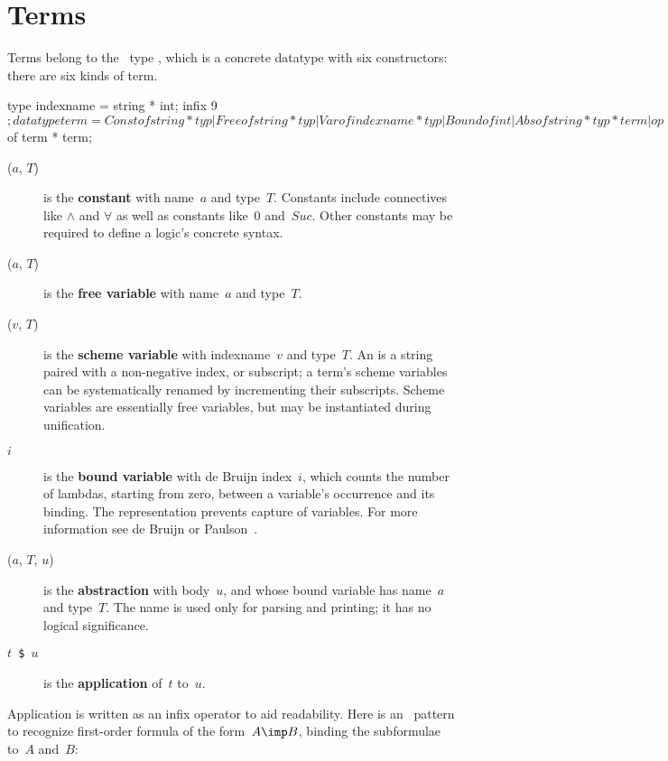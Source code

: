 \section{Terms}
Terms belong to the \ML\ type , which is a concrete datatype
with six constructors: there are six kinds of term.
\begin{ttbox}
type indexname = string * int;
infix 9 $;
datatype term = Const of string * typ
              | Free  of string * typ
              | Var   of indexname * typ
              | Bound of int
              | Abs   of string * typ * term
              | op $  of term * term;
\end{ttbox}
\begin{description}
\item[($a$, $T$)] 
  is the {\bf constant} with name~$a$ and type~$T$.  Constants include
  connectives like $\land$ and $\forall$ as well as constants like~0
  and~$Suc$.  Other constants may be required to define a logic's concrete
  syntax. 

\item[($a$, $T$)] 
is the {\bf free variable} with name~$a$ and type~$T$.

\item[($v$, $T$)] 
is the {\bf scheme variable} with indexname~$v$ and type~$T$.  An
 is a string paired with a non-negative index, or
subscript; a term's scheme variables can be systematically renamed by
incrementing their subscripts.  Scheme variables are essentially free
variables, but may be instantiated during unification.

\item[ $i$] 
is the {\bf bound variable} with de Bruijn index~$i$, which counts the
number of lambdas, starting from zero, between a variable's occurrence and
its binding.  The representation prevents capture of variables.  For more
information see de Bruijn \cite{debruijn72} or
Paulson~\cite[page~336]{paulson91}.

\item[($a$, $T$, $u$)] 
is the {\bf abstraction} with body~$u$, and whose bound variable has
name~$a$ and type~$T$.  The name is used only for parsing and printing; it
has no logical significance.

\item[\tt $t$ \$ $u$] 
is the {\bf application} of~$t$ to~$u$.  
\end{description}
Application is written as an infix operator to aid readability.
Here is an \ML\ pattern to recognize first-order formula of
the form~$A\imp B$, binding the subformulae to~$A$ and~$B$:


